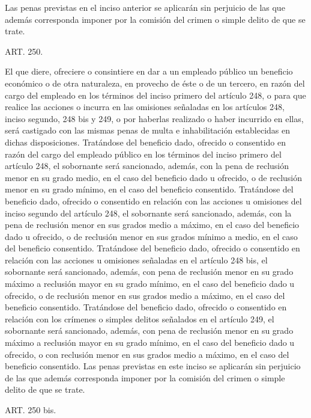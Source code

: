     Las penas previstas en el inciso anterior se aplicarán sin perjuicio de las que además corresponda imponer por la comisión del crimen o simple delito de que se trate.




    ART. 250.

    El que diere, ofreciere o consintiere en dar a un empleado público un beneficio económico o de otra naturaleza, en provecho de éste o de un tercero, en razón del cargo del empleado en los términos del inciso primero del artículo 248, o para que realice las acciones o incurra en las omisiones señaladas en los artículos 248, inciso segundo, 248 bis y 249, o por haberlas realizado o haber incurrido en ellas, será castigado con las mismas penas de multa e inhabilitación establecidas en dichas disposiciones.
    Tratándose del beneficio dado, ofrecido o consentido en razón del cargo del empleado público en los términos del inciso primero del artículo 248, el sobornante será sancionado, además, con la pena de reclusión menor en su grado medio, en el caso del beneficio dado u ofrecido, o de reclusión menor en su grado mínimo, en el caso del beneficio consentido.
    Tratándose del beneficio dado, ofrecido o consentido en relación con las acciones u omisiones del inciso segundo del artículo 248, el sobornante será sancionado, además, con la pena de reclusión menor en sus grados medio a máximo, en el caso del beneficio dado u ofrecido, o de reclusión menor en sus grados mínimo a medio, en el caso del beneficio consentido.
    Tratándose del beneficio dado, ofrecido o consentido en relación con las acciones u omisiones señaladas en el artículo 248 bis, el sobornante será sancionado, además, con pena de reclusión menor en su grado máximo a reclusión mayor en su grado mínimo, en el caso del beneficio dado u ofrecido, o de reclusión menor en sus grados medio a máximo, en el caso del beneficio consentido.
    Tratándose del beneficio dado, ofrecido o consentido en relación con los crímenes o simples delitos señalados en el artículo 249, el sobornante será sancionado, además, con pena de reclusión menor en su grado máximo a reclusión mayor en su grado mínimo, en el caso del beneficio dado u ofrecido, o con reclusión menor en sus grados medio a máximo, en el caso del beneficio consentido. Las penas previstas en este inciso se aplicarán sin perjuicio de las que además corresponda imponer por la comisión del crimen o simple delito de que se trate.




    ART. 250 bis.

